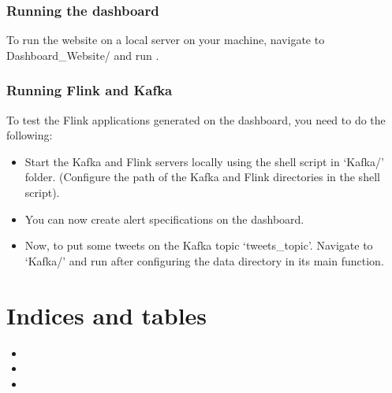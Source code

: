\documentclass[letterpaper,10pt,english]{sphinxmanual}
\begin{document}
\subsection{Running the dashboard}
\label{\detokenize{running:running-the-dashboard}}
To run the website on a local server on your machine, navigate to Dashboard\_Website/ and run .


\subsection{Running Flink and Kafka}
\label{\detokenize{running:running-flink-and-kafka}}
To test the Flink applications generated on the dashboard, you need to do the following:
\begin{itemize}
\item {} 
Start the Kafka and Flink servers locally using the shell script in ‘Kafka/’ folder. (Configure the path of the Kafka and Flink directories in the shell script).

\item {} 
You can now create alert specifications on the dashboard.

\item {} 
Now, to put some tweets on the Kafka topic ‘tweets\_topic’. Navigate to ‘Kafka/’ and run  after configuring the data directory in its main function.

\end{itemize}


\chapter{Indices and tables}
\label{\detokenize{index:indices-and-tables}}\begin{itemize}
\item {} 

\item {} 

\item {} 

\end{itemize}
\end{document}
